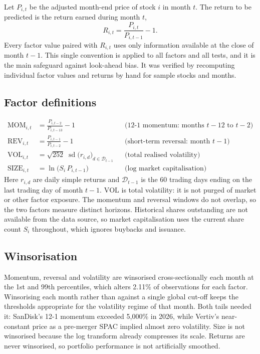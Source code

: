 \documentclass[11pt,a4paper]{article}
\begin{document}
Let $P_{i,t}$ be the adjusted month-end price of stock $i$ in month $t$. The return to be predicted is the return earned during month $t$,
\begin{equation}
R_{i,t} = \frac{P_{i,t}}{P_{i,t-1}} - 1 .
\end{equation}
Every factor value paired with $R_{i,t}$ uses only information available at the close of month $t-1$. This single convention is applied to all factors and all tests, and it is the main safeguard against look-ahead bias. It was verified by recomputing individual factor values and returns by hand for sample stocks and months.

\subsection{Factor definitions}

\begin{align}
\text{MOM}_{i,t} &= \frac{P_{i,t-2}}{P_{i,t-13}} - 1 && \text{(12-1 momentum: months } t-12 \text{ to } t-2\text{)}\\
\text{REV}_{i,t} &= \frac{P_{i,t-1}}{P_{i,t-2}} - 1 && \text{(short-term reversal: month } t-1\text{)}\\
\text{VOL}_{i,t} &= \sqrt{252}\;\operatorname{sd}\big(r_{i,d}\big)_{d \in \mathcal{D}_{t-1}} && \text{(total realised volatility)}\\
\text{SIZE}_{i,t} &= \ln\big(S_i \, P_{i,t-1}\big) && \text{(log market capitalisation)}
\end{align}
Here $r_{i,d}$ are daily simple returns and $\mathcal{D}_{t-1}$ is the 60 trading days ending on the last trading day of month $t-1$. $\text{VOL}$ is total volatility: it is not purged of market or other factor exposure. The momentum and reversal windows do not overlap, so the two factors measure distinct horizons. Historical shares outstanding are not available from the data source, so market capitalisation uses the current share count $S_i$ throughout, which ignores buybacks and issuance.

\subsection{Winsorisation}

Momentum, reversal and volatility are winsorised cross-sectionally each month at the 1st and 99th percentiles, which alters 2.11\% of observations for each factor. Winsorising each month rather than against a single global cut-off keeps the thresholds appropriate for the volatility regime of that month. Both tails needed it: SanDisk's 12-1 momentum exceeded 5,000\% in 2026, while Vertiv's near-constant price as a pre-merger SPAC implied almost zero volatility. Size is not winsorised because the log transform already compresses its scale. Returns are never winsorised, so portfolio performance is not artificially smoothed.
\end{document}
